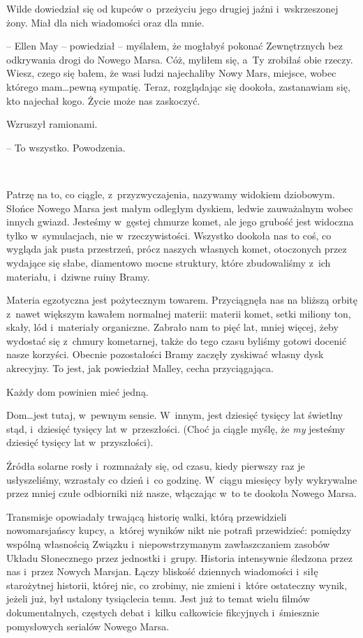 \documentclass[oneside,polish,11pt,sfheadings]{mwbk}
\begin{document}
Wilde dowiedział się od kupców o~przeżyciu jego drugiej jaźni i~wskrzeszonej żony. Miał dla nich wiadomości oraz dla mnie.

-- Ellen May -- powiedział -- myślałem, że mogłabyś pokonać Zewnętrznych
bez odkrywania drogi do Nowego Marsa. Cóż, myliłem się, a~Ty zrobiłaś
obie rzeczy. Wiesz, czego się bałem, że wasi ludzi najechaliby Nowy
Mars, miejsce, wobec którego mam\ldots  pewną sympatię. Teraz, rozglądając
się dookoła, zastanawiam się, kto najechał kogo. Życie może nas
zaskoczyć.

Wzruszył ramionami. 

-- To wszystko. Powodzenia.

~

Patrzę na to, co ciągle, z~przyzwyczajenia, nazywamy widokiem dziobowym.
Słońce Nowego Marsa jest małym odległym dyskiem, ledwie zauważalnym
wobec innych gwiazd. Jesteśmy w~gęstej chmurze komet, ale jego grubość
jest widoczna tylko w~symulacjach, nie w~rzeczywistości. Wszystko
dookoła nas to coś, co wygląda jak pusta przestrzeń, prócz naszych
własnych komet, otoczonych przez wydające się słabe, diamentowo mocne
struktury, które zbudowaliśmy z~ich materiału, i~dziwne ruiny Bramy.

Materia egzotyczna jest pożytecznym towarem. Przyciągnęła nas na bliższą
orbitę z~nawet większym kawałem normalnej materii: materii komet, setki
miliony ton, skały, lód i~materiały organiczne. Zabrało nam to pięć lat,
mniej więcej, żeby wydostać się z~chmury kometarnej, także do tego czasu
byliśmy gotowi docenić nasze korzyści. Obecnie pozostałości Bramy
zaczęły zyskiwać własny dysk akrecyjny. To jest, jak powiedział Malley,
cecha przyciągająca.

Każdy dom powinien mieć jedną.

Dom\ldots  jest tutaj, w~pewnym sensie. W~innym, jest dziesięć tysięcy lat
świetlny stąd, i~dziesięć tysięcy lat w~przeszłości. (Choć ja ciągle
myślę, że \textit{my} jesteśmy dziesięć tysięcy lat w~przyszłości).

Źródła solarne rosły i~rozmnażały się, od czasu, kiedy pierwszy raz je
usłyszeliśmy, wzrastały co dzień i~co godzinę. W~ciągu miesięcy były
wykrywalne przez mniej czułe odbiorniki niż nasze, włączając w~to te
dookoła Nowego Marsa.

Transmisje opowiadały trwającą historię walki, którą przewidzieli
nowomarsjańscy kupcy, a~której wyników nikt nie potrafi przewidzieć:
pomiędzy wspólną własnością Związku i~niepowstrzymanym zawłaszczaniem
zasobów Układu Słonecznego przez jednostki i~grupy. Historia intensywnie
śledzona przez nas i~przez Nowych Marsjan. Łączy bliskość dziennych
wiadomości i~siłę starożytnej historii, której nic, co zrobimy, nie
zmieni i~które ostateczny wynik, jeżeli już, był ustalony tysiąclecia
temu. Jest już to temat wielu filmów dokumentalnych, częstych debat i~kilku całkowicie fikcyjnych i~śmiesznie pomysłowych serialów Nowego
Marsa.
\end{document}
